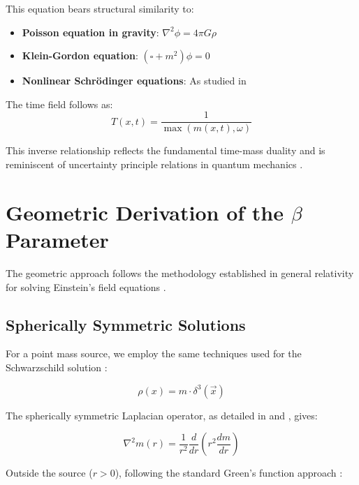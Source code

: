 \documentclass[12pt,a4paper]{article}
\newcommand{\vecx}{\vec{x}}
\begin{document}
	This equation bears structural similarity to:
	\begin{itemize}
		\item \textbf{Poisson equation in gravity}: $\nabla^2 \phi = 4\pi G \rho$ \citep{jackson1998}
		\item \textbf{Klein-Gordon equation}: $(\square + m^2)\phi = 0$ \citep{peskin1995}
		\item \textbf{Nonlinear Schrödinger equations}: As studied in \citep{sulem1999}
	\end{itemize}
	
	The time field follows as:
	\begin{equation}
		\label{eq:time_field_definition}
		T(x,t) = \frac{1}{\max(m(x,t), \omega)}
	\end{equation}
	
	This inverse relationship reflects the fundamental time-mass duality and is reminiscent of uncertainty principle relations in quantum mechanics \citep{heisenberg1927,griffiths2004}.
	
	\section{Geometric Derivation of the $\beta$ Parameter}
	\label{sec:beta_derivation}
	
	The geometric approach follows the methodology established in general relativity for solving Einstein's field equations \citep{schwarzschild1916,misner1973,carroll2004}.
	
	\subsection{Spherically Symmetric Solutions}
\label{subsec:spherical_solutions}

For a point mass source, we employ the same techniques used for the Schwarzschild solution \citep{schwarzschild1916,weinberg1972}:

\begin{equation}
	\rho(x) = m \cdot \delta^3(\vecx)
\end{equation}

The spherically symmetric Laplacian operator, as detailed in \citet{jackson1998} and \citet{griffiths1999}, gives:

\begin{equation}
	\nabla^2 m(r) = \frac{1}{r^2}\frac{d}{dr}\left(r^2 \frac{dm}{dr}\right)
\end{equation}

Outside the source ($r > 0$), following the standard Green's function approach \citep{jackson1998}:
\end{document}
